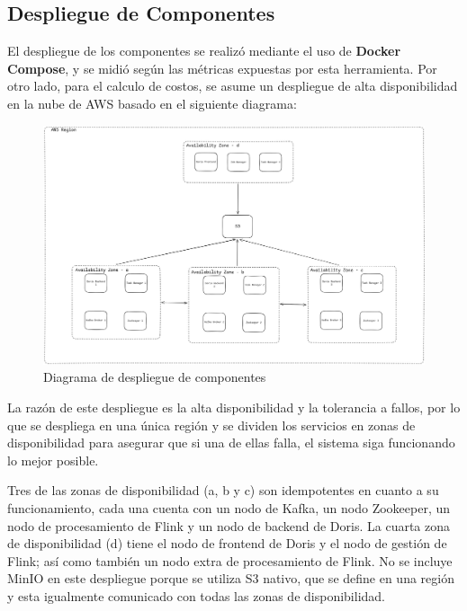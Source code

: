 \clearpage

\subsection{Despliegue de Componentes}

El despliegue de los componentes se realizó mediante el uso de \textbf{Docker Compose}, y se midió según las métricas expuestas por esta herramienta.
Por otro lado, para el calculo de costos, se asume un despliegue de alta disponibilidad en la nube de AWS basado en el siguiente diagrama:

\begin{figure}[h]
    \centering
    \includegraphics[width=1\textwidth]{desarrollo/deployment.png}
    \caption{Diagrama de despliegue de componentes}
    \label{fig:infraestructura}
\end{figure}

\clearpage

La razón de este despliegue es la alta disponibilidad y la tolerancia a fallos, por lo que se despliega en una única región 
y se dividen los servicios en zonas de disponibilidad para asegurar que si una de ellas falla,
el sistema siga funcionando lo mejor posible.

Tres de las zonas de disponibilidad (a, b y c) son idempotentes en cuanto a su funcionamiento, 
cada una cuenta con un nodo de Kafka, un nodo Zookeeper, un nodo de procesamiento de Flink y un nodo de backend de Doris.
La cuarta zona de disponibilidad (d) tiene el nodo de frontend de Doris y el nodo de gestión de Flink; así como también un nodo extra de procesamiento de Flink.
No se incluye MinIO en este despliegue porque se utiliza S3 nativo, que se define en una región y esta igualmente comunicado con todas las zonas de disponibilidad.

